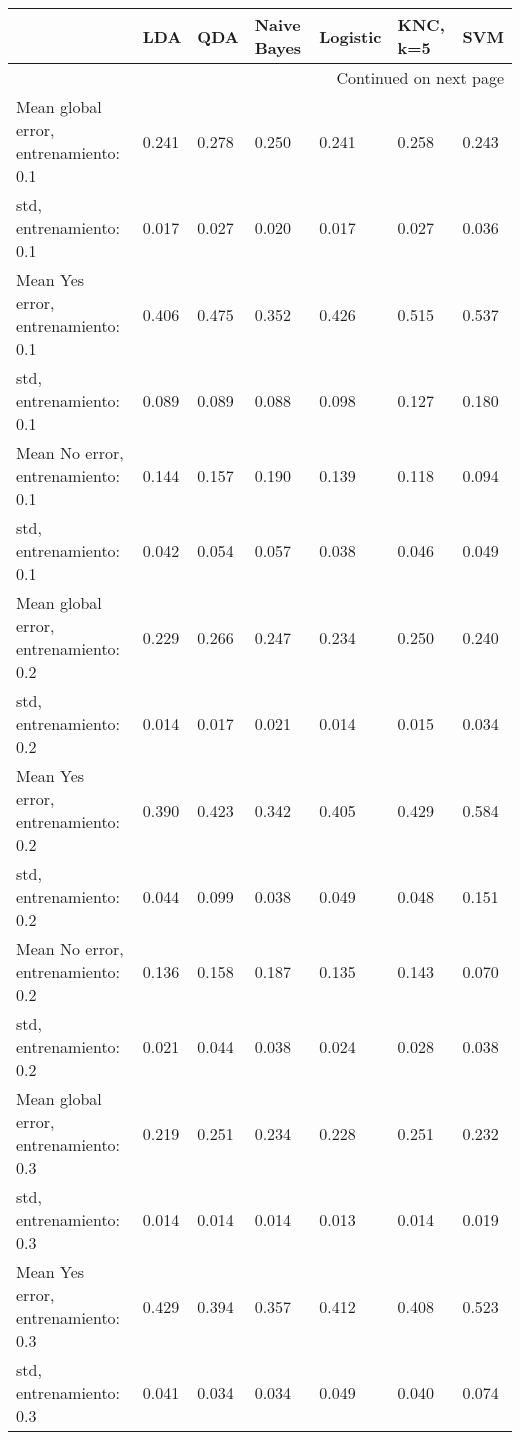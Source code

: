 \begin{longtable}{p{4cm}|p{1.5cm}|p{1.5cm}|p{1.5cm}|p{1.5cm}|p{1.5cm}|p{1.5cm}}
\toprule
{} &   LDA &   QDA &  Naive Bayes &  Logistic &  KNC, k=5 &   SVM \\
\midrule
\endhead
\midrule
\multicolumn{7}{r}{{Continued on next page}} \\
\midrule
\endfoot

\bottomrule
\endlastfoot
Mean global error, entrenamiento: 0.1 & 0.241 & 0.278 &        0.250 &     0.241 &     0.258 & 0.243 \\
std, entrenamiento: 0.1               & 0.017 & 0.027 &        0.020 &     0.017 &     0.027 & 0.036 \\
Mean Yes error, entrenamiento: 0.1    & 0.406 & 0.475 &        0.352 &     0.426 &     0.515 & 0.537 \\
std, entrenamiento: 0.1               & 0.089 & 0.089 &        0.088 &     0.098 &     0.127 & 0.180 \\
Mean No error, entrenamiento: 0.1     & 0.144 & 0.157 &        0.190 &     0.139 &     0.118 & 0.094 \\
std, entrenamiento: 0.1               & 0.042 & 0.054 &        0.057 &     0.038 &     0.046 & 0.049 \\
Mean global error, entrenamiento: 0.2 & 0.229 & 0.266 &        0.247 &     0.234 &     0.250 & 0.240 \\
std, entrenamiento: 0.2               & 0.014 & 0.017 &        0.021 &     0.014 &     0.015 & 0.034 \\
Mean Yes error, entrenamiento: 0.2    & 0.390 & 0.423 &        0.342 &     0.405 &     0.429 & 0.584 \\
std, entrenamiento: 0.2               & 0.044 & 0.099 &        0.038 &     0.049 &     0.048 & 0.151 \\
Mean No error, entrenamiento: 0.2     & 0.136 & 0.158 &        0.187 &     0.135 &     0.143 & 0.070 \\
std, entrenamiento: 0.2               & 0.021 & 0.044 &        0.038 &     0.024 &     0.028 & 0.038 \\
Mean global error, entrenamiento: 0.3 & 0.219 & 0.251 &        0.234 &     0.228 &     0.251 & 0.232 \\
std, entrenamiento: 0.3               & 0.014 & 0.014 &        0.014 &     0.013 &     0.014 & 0.019 \\
Mean Yes error, entrenamiento: 0.3    & 0.429 & 0.394 &        0.357 &     0.412 &     0.408 & 0.523 \\
std, entrenamiento: 0.3               & 0.041 & 0.034 &        0.034 &     0.049 &     0.040 & 0.074 \\

\end{longtable}
